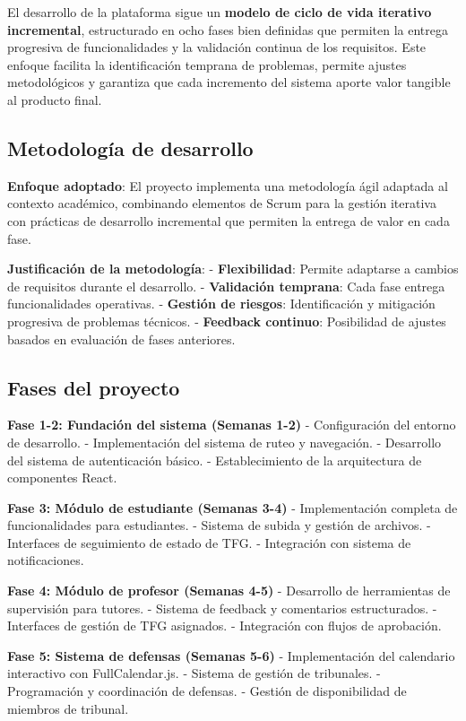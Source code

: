 \documentclass[12pt,a4paper,oneside]{report}
\begin{document}
El desarrollo de la plataforma sigue un \textbf{modelo de ciclo de vida
iterativo incremental}, estructurado en ocho fases bien definidas que
permiten la entrega progresiva de funcionalidades y la validación
continua de los requisitos. Este enfoque facilita la identificación
temprana de problemas, permite ajustes metodológicos y garantiza que
cada incremento del sistema aporte valor tangible al producto final.

\subsection{Metodología de
desarrollo}\label{metodologuxeda-de-desarrollo}

\textbf{Enfoque adoptado}: El proyecto implementa una metodología ágil
adaptada al contexto académico, combinando elementos de Scrum para la
gestión iterativa con prácticas de desarrollo incremental que permiten
la entrega de valor en cada fase.

\textbf{Justificación de la metodología}: - \textbf{Flexibilidad}:
Permite adaptarse a cambios de requisitos durante el desarrollo. -
\textbf{Validación temprana}: Cada fase entrega funcionalidades
operativas. - \textbf{Gestión de riesgos}: Identificación y mitigación
progresiva de problemas técnicos. - \textbf{Feedback continuo}:
Posibilidad de ajustes basados en evaluación de fases anteriores.

\subsection{Fases del proyecto}\label{fases-del-proyecto}

\textbf{Fase 1-2: Fundación del sistema (Semanas 1-2)} - Configuración
del entorno de desarrollo. - Implementación del sistema de ruteo y
navegación. - Desarrollo del sistema de autenticación básico. -
Establecimiento de la arquitectura de componentes React.

\textbf{Fase 3: Módulo de estudiante (Semanas 3-4)} - Implementación
completa de funcionalidades para estudiantes. - Sistema de subida y
gestión de archivos. - Interfaces de seguimiento de estado de TFG. -
Integración con sistema de notificaciones.

\textbf{Fase 4: Módulo de profesor (Semanas 4-5)} - Desarrollo de
herramientas de supervisión para tutores. - Sistema de feedback y
comentarios estructurados. - Interfaces de gestión de TFG asignados. -
Integración con flujos de aprobación.

\textbf{Fase 5: Sistema de defensas (Semanas 5-6)} - Implementación del
calendario interactivo con FullCalendar.js. - Sistema de gestión de
tribunales. - Programación y coordinación de defensas. - Gestión de
disponibilidad de miembros de tribunal.
\end{document}
